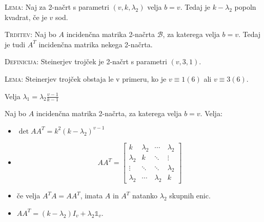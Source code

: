 \documentclass[8pt,a4paper]{amsart}
\theoremstyle{definition} %
\theoremstyle{plain} %
\begin{document}
\textsc{Lema:} Naj za 2-načrt s parametri $(v,k,\lambda_2)$ velja $b=v$. Tedaj je $k-\lambda_2$ popoln kvadrat, če je $v$ sod.

\textsc{Trditev:} Naj bo $A$ incidenčna matrika 2-načrta $\mathcal{B}$, za katerega velja $b=v$. Tedaj je tudi $A^T$ incidenčna matrika nekega 2-načrta.

\textsc{Definicija:} Steinerjev trojček je 2-načrt s parametri $(v,3,1)$.

\textsc{Lema:} Steinerjev trojček obstaja le v primeru, ko je $v \equiv 1 (6)$ ali $v \equiv 3 (6)$.

Velja $\lambda_1 = \lambda_2 \frac{v-1}{k-1}$

Naj bo $A$ incidenčna matrika 2-načrta, za katerega velja $b=v$. Velja:
\begin{itemize}
\item $\det{AA^T}=k^2(k-\lambda_2)^{v-1}$
\item
$$
AA^T =  \left[ \begin{matrix}
k & \lambda_2 & \cdots & \lambda_2 \\
\lambda_2 & k & \ddots & \vdots \\
\vdots & \ddots &  \ddots & \lambda_2 \\
\lambda_2 & \cdots & \lambda_2 & k
\end{matrix} \right]
$$
\item če velja $A^TA = AA^T$, imata $A$ in $A^T$ natanko $\lambda_2$ skupnih enic.
\item $AA^T = (k-\lambda_2)I_v + \lambda_2 \mathbb{1}_v$.
\end{itemize}
\end{document}
